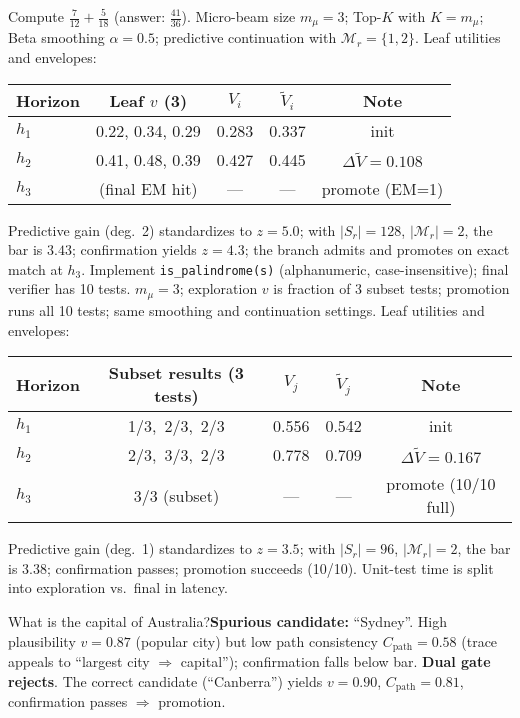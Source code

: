 \documentclass{article}
\begin{document}
Compute $\frac{7}{12}+\frac{5}{18}$ (answer: $\frac{41}{36}$).
Micro-beam size $m_\mu{=}3$; Top-$K$ with $K=m_\mu$; Beta smoothing $\alpha{=}0.5$; predictive continuation with $\mathcal{M}_r{=}\{1,2\}$.
Leaf utilities and envelopes:
\begin{center}
\begin{tabular}{lcccc}
\toprule
Horizon & Leaf $v$ (3) & $V_i$ & $\tilde V_i$ & Note \\
\midrule
$h_1$ & 0.22, 0.34, 0.29 & 0.283 & 0.337 & init \\
$h_2$ & 0.41, 0.48, 0.39 & 0.427 & 0.445 & $\Delta\tilde V{=}0.108$ \\
$h_3$ & (final EM hit)   & ---    & ---    & promote (EM=1) \\
\bottomrule
\end{tabular}
\end{center}
\noindent Predictive gain (deg.\ 2) standardizes to $z{=}5.0$; with $|S_r|{=}128$, $|\mathcal{M}_r|{=}2$, the bar is $3.43$; confirmation yields $z{=}4.3$; the branch admits and promotes on exact match at $h_3$.
Implement \texttt{is\_palindrome(s)} (alphanumeric, case-insensitive); final verifier has 10 tests.
$m_\mu{=}3$; exploration $v$ is fraction of 3 subset tests; promotion runs all 10 tests; same smoothing and continuation settings.
Leaf utilities and envelopes:
\begin{center}
\begin{tabular}{lcccc}
\toprule
Horizon & Subset results (3 tests) & $V_j$ & $\tilde V_j$ & Note \\
\midrule
$h_1$ & 1/3,\ 2/3,\ 2/3 & 0.556 & 0.542 & init \\
$h_2$ & 2/3,\ 3/3,\ 2/3 & 0.778 & 0.709 & $\Delta\tilde V{=}0.167$ \\
$h_3$ & 3/3 (subset)    & ---   & ---   & promote (10/10 full) \\
\bottomrule
\end{tabular}
\end{center}
\noindent Predictive gain (deg.\ 1) standardizes to $z{=}3.5$; with $|S_r|{=}96$, $|\mathcal{M}_r|{=}2$, the bar is $3.38$; confirmation passes; promotion succeeds (10/10). Unit-test time is split into exploration vs.\ final in latency.

What is the capital of Australia?\quad \textbf{Spurious candidate:} ``Sydney''.
High plausibility $v{=}0.87$ (popular city) but low path consistency $C_{\text{path}}{=}0.58$ (trace appeals to ``largest city $\Rightarrow$ capital''); confirmation falls below bar. \textbf{Dual gate rejects}. The correct candidate (``Canberra'') yields $v{=}0.90$, $C_{\text{path}}{=}0.81$, confirmation passes $\Rightarrow$ promotion.
\end{document}

